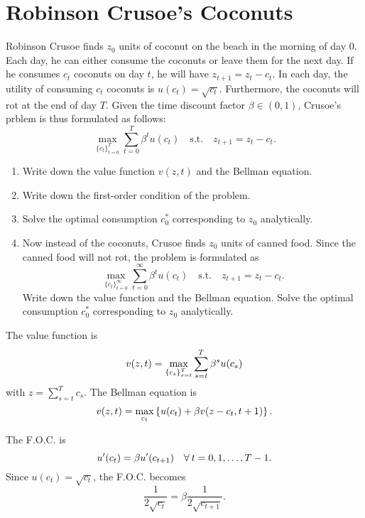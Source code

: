 \documentclass[12pt]{article}
\begin{document}
\section{Robinson Crusoe's Coconuts}
Robinson Crusoe finds $z_0$ units of coconut on the beach in 
the morning of day $0$. Each day, he can either consume the 
coconuts or leave them for the next day. If he consumes $c_t$ 
coconuts on day $t$, he will have $z_{t+1} = z_t - c_t$. In 
each day, the utility of consuming $c_t$ coconuts is $u(c_t) = 
\sqrt{c_t}$. Furthermore, the coconuts will rot at the end of 
day $T$. Given the time discount factor $\beta\in(0,1)$, 
Crusoe's prblem is thus formulated as follows: 
\begin{equation*}
    \max_{\{c_t\}_{t=0}^T} \sum_{t=0}^T \beta^t u(c_t) 
    \quad \text{s.t.} \quad z_{t+1} = z_t - c_t. 
\end{equation*}
\begin{enumerate}
    \item Write down the value function $v(z, t)$ and the 
    Bellman equation. 
    \item Write down the first-order condition of the problem. 
    \item Solve the optimal consumption $c^*_0$ corresponding 
    to $z_0$ analytically. 
    \item Now instead of the coconuts, Crusoe finds $z_0$ units 
    of canned food. Since the canned food will not rot, the 
    problem is formulated as 
    \begin{equation*}
        \max_{\{c_t\}_{t=0}^\infty} \sum_{t=0}^\infty \beta^t u(c_t) 
        \quad \text{s.t.} \quad z_{t+1} = z_t - c_t.
    \end{equation*}
    Write down the value function and the Bellman equation. 
    Solve the optimal consumption $c^*_0$ corresponding to 
    $z_0$ analytically.
\end{enumerate}
\begin{sol}[3.1]
    The value function is 
    \begin{equation*}
        v(z, t) = \max_{\left\{ {c_s} \right\}_{s=t}^T} \sum_{s=t}^T \beta^s u(c_s) 
    \end{equation*}
    with $z = \sum_{s=t}^{T}c_s$. The Bellman equation is 
    \begin{equation*}
        v(z, t) = \max_{c_{t}} \left\{ {u(c_t) + \beta v(z-c_t, t+1)} \right\}.
    \end{equation*}
\end{sol}
\begin{sol}[3.2]
    The F.O.C. is 
    \begin{equation*}
        u'(c_t) = \beta u'(c_{t+1})\quad \forall\: t = 0,1,\ldots,T-1.
    \end{equation*}
    Since $u(c_t) = \sqrt{c_t}$, the F.O.C. becomes 
    \begin{equation*}
        \frac{1}{2\sqrt{c_t}} = \beta \frac{1}{2\sqrt{c_{t+1}}}.
    \end{equation*}
\end{sol}
\end{document}

